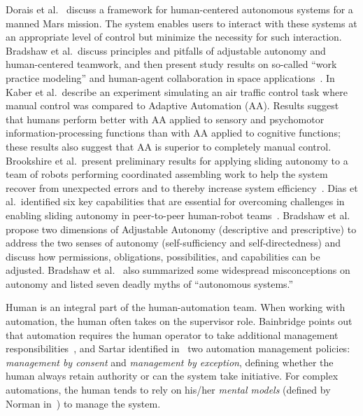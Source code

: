 \documentclass[journal]{IEEEtran}
\begin{document}
Dorais et al.\ \cite{Dorais1998AdjustableAutonomy} discuss a framework for human-centered autonomous systems for a manned Mars mission. The system enables users to interact with these systems at an appropriate level of control but minimize the necessity for such interaction. Bradshaw et al.\ discuss principles and pitfalls of adjustable autonomy and human-centered teamwork, and then present study results on so-called ``work practice modeling'' and human-agent collaboration in space applications~\cite{Bradshaw2003AdjustableAutonomy}. In~\cite{Kaber2005Adaptive} Kaber et al.\ describe an experiment simulating an air traffic control task where manual control was compared to Adaptive Automation (AA). Results suggest that humans perform better with AA applied to sensory and psychomotor information-processing functions than with AA applied to cognitive functions; these results also suggest that AA is superior to completely manual control. Brookshire et al.\ present preliminary results for applying sliding autonomy to a team of robots performing coordinated assembling work to help the system recover from unexpected errors and to thereby increase system efficiency~\cite{Brookshire2004Preliminary}. Dias et al.\ identified six key capabilities that are essential for overcoming challenges in enabling sliding autonomy in peer-to-peer human-robot teams~\cite{Dias2008SlidingAutonomy}. Bradshaw et al.\ \cite{Bradshaw2004Dimensions} propose two dimensions of Adjustable Autonomy (descriptive and prescriptive) to address the two senses of autonomy (self-sufficiency and self-directedness) and discuss how permissions, obligations, possibilities, and capabilities can be adjusted. Bradshaw et al.\ \cite{Bradshaw2013Seven} also summarized some widespread misconceptions on autonomy and listed seven deadly myths of ``autonomous systems.''

Human is an integral part of the human-automation team. When working with automation, the human often takes on the supervisor role. Bainbridge points out that automation requires the human operator to take additional management responsibilities~\cite{Bainbridge1983Ironies}, and Sartar identified in~\cite{Sarter1998Making} two automation management policies: \textit{management by consent} and \textit{management by exception}, defining whether the human always retain authority or can the system take initiative. For complex automations, the human tends to rely on his/her \textit{mental models} (defined by Norman in~\cite{Norman1983Some}) to manage the system. 
\end{document}
